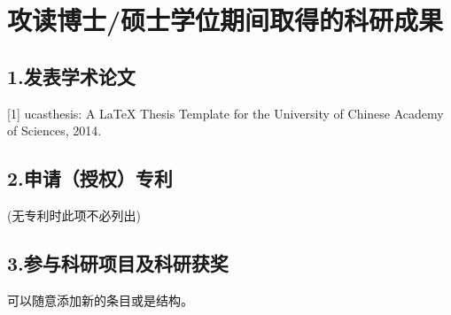\chapter{攻读博士/硕士学位期间取得的科研成果}


\section*{1.发表学术论文}

[1] ucasthesis: A LaTeX Thesis Template for the University of Chinese Academy of Sciences, 2014.


\section*{2.申请（授权）专利}

(无专利时此项不必列出)

\section*{3.参与科研项目及科研获奖 }

可以随意添加新的条目或是结构。


\cleardoublepage[plain]%
